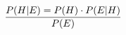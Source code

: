 \documentclass[preview]{standalone}
\begin{document}
\begin{align*}
P(H|E) = {P(H) \cdot P(E|H)} \over {P(E)}
\end{align*}
\end{document}
